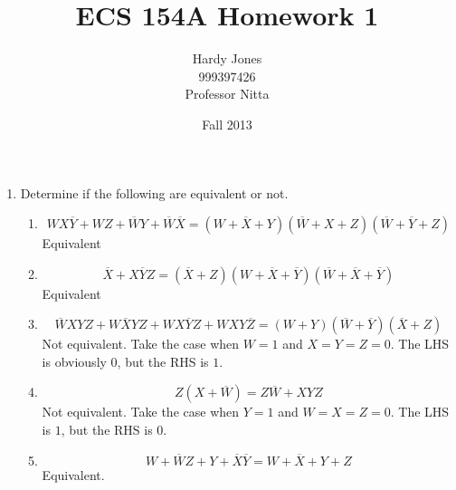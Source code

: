 \documentclass[12pt,letterpaper]{article}
\title{ECS 154A Homework 1\vspace{-2ex}}
\author{Hardy Jones\\
        999397426\\
        Professor Nitta\vspace{-2ex}}
\date{Fall 2013}
\begin{document}
  \maketitle

  \begin{enumerate}
    \item
      Determine if the following are equivalent or not.
      \begin{enumerate}
        \item
          \[
            WX\overline{Y} + WZ + \overline{W}Y + \overline{W} \overline{X} =
            (W + \overline{X} + Y)(\overline{W} + X + Z)(\overline{W} + \overline{Y} + Z)
          \]
          Equivalent
        \item
          \[
            \overline{X} + X\overline{Y}Z =
            (\overline{X} + Z)(W + \overline{X} + \overline{Y})(\overline{W} + \overline{X} + \overline{Y})
          \]
          Equivalent
        \item
          \[
            \overline{W}XYZ + W\overline{X}YZ + WX\overline{Y}Z + WXY\overline{Z} =
            (W + Y)(\overline{W} + \overline{Y})(\overline{X} + Z)
          \]
          Not equivalent.
          Take the case when $W = 1$ and $X = Y = Z = 0$.
          The LHS is obviously $0$, but the RHS is $1$.
        \item
          \[
            Z(X + \overline{W}) = Z\overline{W} + XYZ
          \]
          Not equivalent.
          Take the case when $Y = 1$ and $W = X = Z = 0$.
          The LHS is $1$, but the RHS is $0$.
        \item
          \[
            W + \overline{W}Z + Y + \overline{X}\overline{Y} = W + \overline{X} + Y + Z
          \]
          Equivalent.
      \end{enumerate}
  \end{enumerate}
\end{document}
